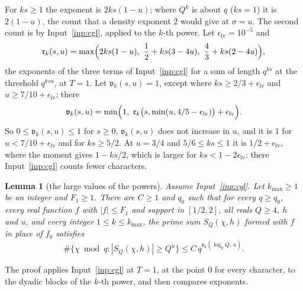 \documentclass[11pt]{article}
\newtheorem{lemma}[theorem]{Lemma}
\theoremstyle{definition}
\begin{document}
For $ks \ge 1$ the exponent is $2ks(1 - u)$; where $Q^k$ is about $q$ ($ks = 1$) it is $2(1 - u)$, the count that a
density exponent $2$ would give at $\sigma = u$. The second count is by Input~\ref{inp:cgl}, applied to the $k$-th
power. Let $\epsilon_{\mathrm{lv}} = 10^{-5}$
and
\[
  \mathfrak r_k(s, u) = \max\Bigl(2ks(1 - u),\ \frac12 + ks(3 - 4u),\ \frac43 + ks(2 - 4u)\Bigr),
\]
the exponents of the three terms of Input~\ref{inp:cgl} for a sum of length $q^{ks}$ at the threshold $q^{ksu}$, at $T
= 1$.
Let $\mathfrak v_k(s, u) = 1$, except where $ks \ge 2/3 + \epsilon_{\mathrm{lv}}$ and $u \ge 7/10 +
\epsilon_{\mathrm{lv}}$; there
\[
  \mathfrak v_k(s, u) = \min\Bigl(1,\ \mathfrak r_k\bigl(s, \min(u, 4/5 - \epsilon_{\mathrm{lv}})\bigr) +
  \epsilon_{\mathrm{lv}}
  \Bigr).
\]
So $0 \le \mathfrak v_k(s, u) \le 1$ for $s \ge 0$, $\mathfrak v_k(s, u)$ does not increase in $u$, and it is $1$ for
$u < 7/10 + \epsilon_{\mathrm{lv}}$ and for $ks \ge 5/2$. At $u = 3/4$ and $5/6
\le ks \le 1$ it is $1/2 + \epsilon_{\mathrm{lv}}$, where the moment gives $1 - ks/2$, which is larger for $ks < 1 -
2\epsilon_{\mathrm{lv}}$: there Input~\ref{inp:cgl} counts fewer characters.

\begin{lemma}[the large values of the powers]\label{lem:lv-powers}
Assume Input~\ref{inp:cgl}. Let $k_{\max} \ge 1$ be an integer and $F_1 \ge 1$. There are $C \ge 1$ and $q_0$ such that
for every $q \ge q_0$, every real function $f$ with $|f| \le F_1$ and support in $[1/2, 2]$, all reals $Q \ge 4$,
$h$ and $u$, and every integer $1 \le k \le k_{\max}$, the prime sum $S_Q(\chi, h)$ formed with $f$ in place of $f_0$
satisfies
\[
  \#\{\chi \bmod q : |S_Q(\chi, h)| \ge Q^u\} \le C\, q^{\mathfrak v_k(\log_q Q,\, u)}.
\]
\end{lemma}

The proof applies Input~\ref{inp:cgl} at $T = 1$, at the point $0$ for every character, to the dyadic blocks of the
$k$-th power, and then compares exponents.
\end{document}
